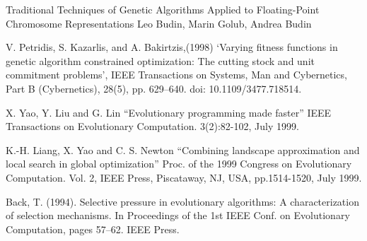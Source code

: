 \documentclass{article}
\begin{document}
\begin{thebibliography}{1}


Traditional Techniques of Genetic Algorithms Applied to Floating-Point
Chromosome Representations
Leo Budin, Marin Golub, Andrea Budin

V. Petridis, S. Kazarlis, and A. Bakirtzis,(1998) ‘Varying fitness functions in genetic algorithm constrained optimization: The cutting stock and unit commitment problems’, IEEE Transactions on Systems, Man and Cybernetics, Part B (Cybernetics), 28(5), pp. 629–640. doi: 10.1109/3477.718514.

X. Yao, Y. Liu and G. Lin “Evolutionary programming made faster” IEEE Transactions on Evolutionary Computation. 3(2):82-102, July 1999.

K.-H. Liang, X. Yao and C. S. Newton “Combining landscape approximation and local search in global optimization” Proc. of the 1999 Congress on Evolutionary Computation. Vol. 2, IEEE Press, Piscataway, NJ, USA, pp.1514-1520, July 1999.

Back, T. (1994). Selective pressure in evolutionary algorithms: A characterization of selection mechanisms. In Proceedings of the 1st IEEE Conf. on Evolutionary Computation, pages 57–62. IEEE Press.

\end{thebibliography}
\end{document}
